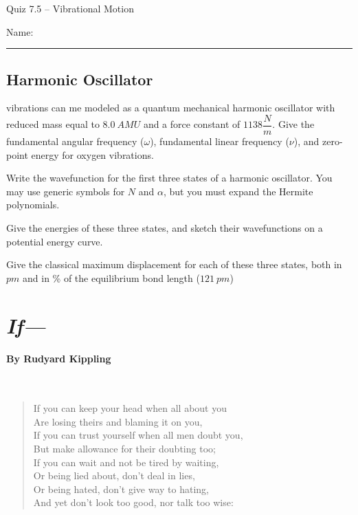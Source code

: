 \documentclass[11pt, letterpaper]{memoir}
\begin{document}
\begin{center}
	{\large Quiz 7.5 --	Vibrational Motion}
\end{center}
{\large Name: \rule[-1mm]{4in}{.1pt}

\subsection*{Harmonic Oscillator}
 vibrations can me modeled as a quantum mechanical harmonic oscillator with reduced mass equal to $8.0~AMU$ and a force constant of $1138\dfrac{N}{m}$. Give the fundamental angular frequency ($\omega$), fundamental linear frequency ($\nu$), and zero-point energy for oxygen vibrations.

\vspace{20em}\noindent
Write the wavefunction for the first three states of a harmonic oscillator. You  may use generic symbols for $N$ and $\alpha$, but you must expand the Hermite polynomials.

\vspace{20em}\noindent
Give the energies of these three states, and sketch their wavefunctions on a potential energy curve.

\vspace{20em}\noindent
Give the classical maximum displacement for each of these three states, both in $pm$ and in \% of the equilibrium  bond length ($121~pm$)

\newpage
\pagestyle{empty}
\addtocounter{page}{-1}
\section*{\emph{If---}}
\paragraph{By Rudyard Kippling}~
\begin{verse}
	If you can keep your head when all about you\\
	\hspace{0.5em} Are losing theirs and blaming it on you,\\
	If you can trust yourself when all men doubt you,\\
	\hspace{0.5em} But make allowance for their doubting too;\\
	If you can wait and not be tired by waiting,\\
	\hspace{0.5em} Or being lied about, don’t deal in lies,\\
	Or being hated, don’t give way to hating,\\
	\hspace{0.5em} And yet don’t look too good, nor talk too wise:


\end{verse}}
\end{document}
